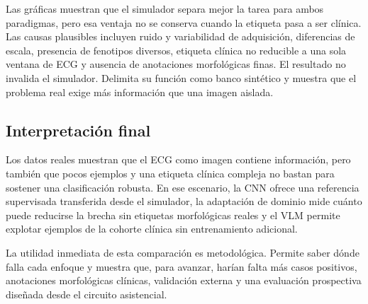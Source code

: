 Las gráficas muestran que el simulador separa mejor la tarea para ambos paradigmas, pero esa ventaja no se conserva cuando la etiqueta pasa a ser clínica. Las causas plausibles incluyen ruido y variabilidad de adquisición, diferencias de escala, presencia de fenotipos diversos, etiqueta clínica no reducible a una sola ventana de ECG y ausencia de anotaciones morfológicas finas. El resultado no invalida el simulador. Delimita su función como banco sintético y muestra que el problema real exige más información que una imagen aislada.

\subsection{Interpretación final}

Los datos reales muestran que el ECG como imagen contiene información, pero también que pocos ejemplos y una etiqueta clínica compleja no bastan para sostener una clasificación robusta. En ese escenario, la CNN ofrece una referencia supervisada transferida desde el simulador, la adaptación de dominio mide cuánto puede reducirse la brecha sin etiquetas morfológicas reales y el VLM permite explotar ejemplos de la cohorte clínica sin entrenamiento adicional.

La utilidad inmediata de esta comparación es metodológica. Permite saber dónde falla cada enfoque y muestra que, para avanzar, harían falta más casos positivos, anotaciones morfológicas clínicas, validación externa y una evaluación prospectiva diseñada desde el circuito asistencial.
